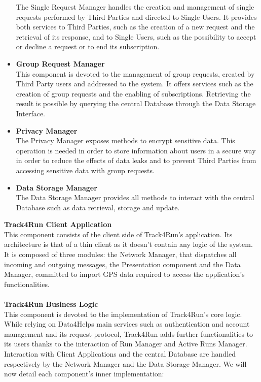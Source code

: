 \documentclass[titlepage]{article}
\begin{document}
\begin{itemize}
		The Single Request Manager handles the creation and management of single requests performed by Third Parties and directed to Single Users. It provides both services to Third Parties, such as the creation of a new request and the retrieval of its response, and to Single Users, such as the possibility to accept or decline a request or to end its subscription.
		\item {\bf Group Request Manager }\\
		This component is devoted to the management of group requests, created by Third Party users and addressed to the system. It offers services such as the creation of group requests and the enabling of subscriptions. Retrieving the result is possible by querying the central Database through the Data Storage Interface.
		\item {\bf Privacy Manager }\\
		The Privacy Manager exposes methods to encrypt sensitive data. This operation is needed in order to store information about users in a secure way in order to reduce the effects of data leaks and to prevent Third Parties from accessing sensitive data with group requests. 
		\item {\bf Data Storage Manager }\\
		The Data Storage Manager provides all methods to interact with the central Database such as data retrieval, storage and update.
    \end{itemize}    
{\bf Track4Run Client Application }\\ 
This component consists of the client side of Track4Run’s application. Its architecture is that of a thin client as it doesn’t contain any logic of the system. It is composed of three modules: the Network Manager, that dispatches all incoming and outgoing messages, the Presentation component and the Data Manager, committed to import GPS data required to access the application’s functionalities. \\ \\
{\bf Track4Run Business Logic }\\ 
This component is devoted to the implementation of Track4Run’s core logic. While relying on Data4Helps main services such as authentication and account management and its request protocol, Track4Run adds further functionalities to its users thanks to the interaction of Run Manager and Active Runs Manager. 
Interaction with Client Applications and the central Database are handled respectively by the Network Manager and the Data Storage Manager.
We will now detail each component’s inner implementation:
\end{document}
